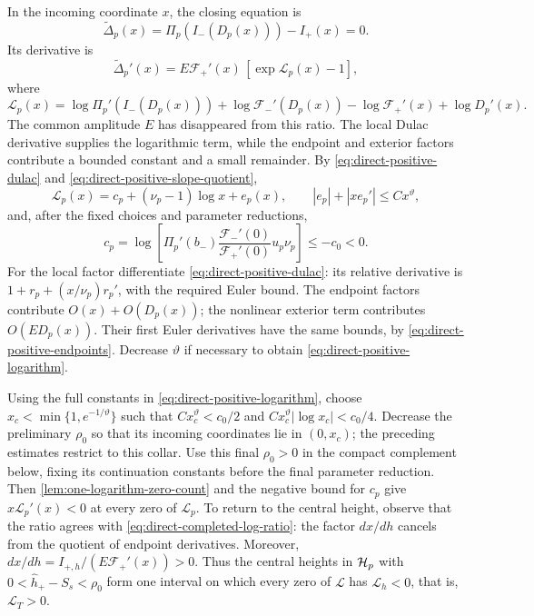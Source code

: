 In the incoming coordinate \(x\), the closing equation is
\[
 \widetilde\Delta_p(x)=\Pi_p(I_-(D_p(x)))-I_+(x)=0.
\]
Its derivative is
\begin{equation}
\label{eq:direct-positive-completed-derivative}
 \widetilde\Delta_p'(x)=E\mathcal F_+'(x)\,[\exp\mathcal L_p(x)-1],
\end{equation}
where
\[
 \mathcal L_p(x)=
 \log \Pi_p'(I_-(D_p(x)))+\log\mathcal F_-'(D_p(x))
             -\log\mathcal F_+'(x)+\log D_p'(x).
\]
The common amplitude \(E\) has disappeared from this ratio. The local
Dulac derivative supplies the logarithmic term, while the endpoint and
exterior factors contribute a bounded constant and a small remainder.
By \eqref{eq:direct-positive-dulac} and
\eqref{eq:direct-positive-slope-quotient},
\begin{equation}
\label{eq:direct-positive-logarithm}
 \mathcal L_p(x)=c_p+(\nu_p-1)\log x+e_p(x),\qquad
 |e_p|+|xe_p'|\le Cx^\vartheta,
\end{equation}
and, after the fixed choices and parameter reductions,
\[
 c_p=\log\left[
 \Pi_p'(b_-)\frac{\mathcal F_-'(0)}{\mathcal F_+'(0)}u_p\nu_p\right]\le-c_0<0.
\]
For the local factor differentiate
\eqref{eq:direct-positive-dulac}: its relative derivative is
\(1+r_p+(x/\nu_p)r_p'\), with the required Euler bound.
The endpoint factors contribute \(O(x)+O(D_p(x))\);
the nonlinear exterior term contributes \(O(ED_p(x))\).
Their first Euler derivatives have the same bounds, by
\eqref{eq:direct-positive-endpoints}. Decrease \(\vartheta\)
if necessary to obtain \eqref{eq:direct-positive-logarithm}.

Using the full constants in \eqref{eq:direct-positive-logarithm}, choose
\(x_c<\min\{1,e^{-1/\vartheta}\}\) such that
\(Cx_c^\vartheta<c_0/2\) and
\(Cx_c^\vartheta|\log x_c|<c_0/4\).
Decrease the preliminary \(\rho_0\) so that its incoming coordinates
lie in \((0,x_c)\); the preceding estimates restrict to this collar.
Use this final \(\rho_0>0\) in the compact complement below, fixing its
continuation constants before the final parameter reduction.
Then \cref{lem:one-logarithm-zero-count} and the negative bound for \(c_p\)
give \(x\mathcal L_p'(x)<0\) at every zero of \(\mathcal L_p\).
To return to the central height, observe that the ratio agrees with
\eqref{eq:direct-completed-log-ratio}: the factor \(dx/dh\) cancels
from the quotient of endpoint derivatives. Moreover,
\(dx/dh=I_{+,h}/(E\mathcal F_+'(x))>0\). Thus the central heights in \(\mathcal H_p\)
with \(0<\widehat h_+-S_s<\rho_0\) form one interval on which
every zero of \(\mathcal L\) has \(\mathcal L_h<0\), that is,
\(\mathcal L_T>0\).


